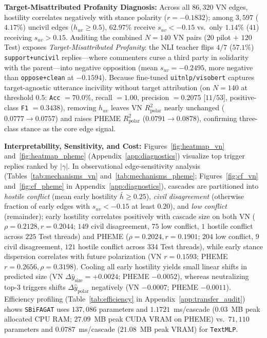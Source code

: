 \documentclass[conference]{IEEEtran}
\begin{document}
\textbf{Target-Misattributed Profanity Diagnosis:} Across all $86{,}320$ VN edges, hostility correlates negatively with stance polarity ($r = -0.1832$); among $3{,}597$ ($4.17\%$) uncivil edges ($h_{uv} \ge 0.5$), $62.97\%$ receive $s_{uv} < -0.15$ vs.\ only $1.14\%$ ($41$) receiving $s_{uv} > 0.15$. Auditing the combined $N = 140$ VN pairs ($20$ pilot $+$ $120$ Test) exposes \emph{Target-Misattributed Profanity}: the NLI teacher flips $4/7$ ($57.1\%$) \texttt{support+uncivil} replies---where commenters curse a third party in solidarity with the parent---into negative opposition (mean $s_{uv} = -0.2495$, more negative than \texttt{oppose+clean} at $-0.1594$). Because fine-tuned \texttt{uitnlp/visobert} captures target-agnostic utterance incivility without target attribution (on $N=140$ at threshold $0.5$: \texttt{Acc} $= 70.0\%$, recall $= 1.00$, precision $= 0.2075$ [$11/53$], positive-class \texttt{F1} $= 0.3438$), removing $h_{uv}$ leaves VN $R^2_{\text{polar}}$ nearly unchanged ($0.0777 \to 0.0757$) and raises PHEME $R^2_{\text{polar}}$ ($0.0791 \to 0.0878$), confirming three-class stance as the core edge signal.

\textbf{Interpretability, Sensitivity, and Cost:} Figures~\ref{fig:heatmap_vn} and~\ref{fig:heatmap_pheme} (Appendix~\ref{app:diagnostics}) visualize top trigger replies ranked by $|\gamma|$. In observational edge-sensitivity analysis (Tables~\ref{tab:mechanisms_vn} and~\ref{tab:mechanisms_pheme}; Figures~\ref{fig:cf_vn} and~\ref{fig:cf_pheme} in Appendix~\ref{app:diagnostics}), cascades are partitioned into \emph{hostile conflict} (mean early hostility $\bar{h} \ge 0.25$), \emph{civil disagreement} (otherwise fraction of early edges with $s_{uv} < -0.15$ at least $0.20$), and \emph{low conflict} (remainder); early hostility correlates positively with cascade size on both VN ($\rho = 0.2128, r = 0.2044$; $149$ civil disagreement, $75$ low conflict, $1$ hostile conflict across $225$ Test threads) and PHEME ($\rho = 0.2024, r = 0.1901$; $204$ low conflict, $9$ civil disagreement, $121$ hostile conflict across $334$ Test threads), while early stance dispersion correlates with future polarization (VN $r = 0.1593$; PHEME $r = 0.2656, \rho = 0.3198$). Cooling all early hostility yields small linear shifts in predicted size (VN $\Delta\hat{y}_{\text{size}} = +0.0024$; PHEME $-0.0052$), whereas neutralizing top-3 triggers shifts $\Delta\hat{y}_{\text{polar}}$ negatively (VN $-0.0007$; PHEME $-0.0011$). Efficiency profiling (Table~\ref{tab:efficiency} in Appendix~\ref{app:transfer_audit}) shows \texttt{SBiFAGAT} uses $137{,}086$ parameters and $1.1721$~ms/cascade ($0.03$~MB peak allocated CPU RAM; $27.09$~MB peak CUDA VRAM on PHEME) vs.\ $71{,}110$ parameters and $0.0787$~ms/cascade ($21.08$~MB peak VRAM) for \texttt{TextMLP}.
\end{document}
